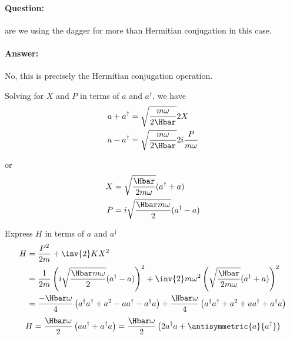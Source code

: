 \paragraph{Question:} are we using the dagger for more than Hermitian conjugation in this case.
\paragraph{Answer:} No, this is precisely the Hermitian conjugation operation.

Solving for \(X\) and \(P\) in terms of \(a\) and \(a^\dagger\), we have
%
\begin{equation}\label{eqn:lecture11harmonicOscillator:620}
\begin{aligned}
a + a^\dagger &= \sqrt{\frac{m \omega}{2 \Hbar}} 2 X  \\
a - a^\dagger &= \sqrt{\frac{m \omega}{2 \Hbar}} 2 i \frac{P }{m \omega}
\end{aligned}
\end{equation}

or
\begin{equation}\label{eqn:PHY356FLecture11:30}
\begin{aligned}
X &= \sqrt{\frac{\Hbar}{2 m \omega}} (a^\dagger + a) \\
P &= i \sqrt{\frac{\Hbar m \omega}{2}} (a^\dagger -a)
\end{aligned}
\end{equation}

Express \(H\) in terms of \(a\) and \(a^\dagger\)
%
\begin{equation}\label{eqn:lecture11harmonicOscillator:640}
\begin{aligned}
H
&= \frac{P^2}{2m} + \inv{2} K X^2  \\
&=
\frac{1}{2m} \left(
i \sqrt{\frac{\Hbar m \omega}{2}} (a^\dagger -a)
\right)^2
+ \inv{2} m \omega^2
\left(
\sqrt{\frac{\Hbar}{2 m \omega}} (a^\dagger + a)
\right)^2 \\
&=
\frac{-\Hbar \omega}{4} \left(
a^\dagger a^\dagger + a^2 - a a^\dagger - a^\dagger a
\right)
+ \frac{\Hbar \omega}{4}
\left(
a^\dagger a^\dagger + a^2 + a a^\dagger + a^\dagger a
\right) \\
\end{aligned}
\end{equation}
%
\begin{equation}\label{eqn:PHY356FLecture11:66}
H
=
\frac{\Hbar \omega}{2} \left(
a a^\dagger + a^\dagger a
\right)
=
\frac{\Hbar \omega}{2} \left(
2 a^\dagger a + \antisymmetric{a}{a^\dagger}
\right)
\end{equation}

